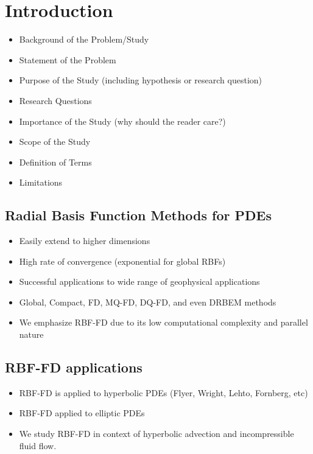 
\chapter{Introduction}

\begin{itemize} 
	\item Background of  the Problem/Study
	\item Statement of the Problem 
	\item Purpose of the Study (including hypothesis or research question)
	\item Research Questions
	\item Importance of the Study (why should the reader care?)
	\item Scope of the Study
	\item Definition of Terms
	\item Limitations
\end{itemize} 


\section{Radial Basis Function Methods for PDEs}

\begin{itemize}
\item Easily extend to higher dimensions
\item High rate of convergence (exponential for global RBFs)
\item Successful applications to wide range of geophysical applications
\item Global, Compact, FD, MQ-FD, DQ-FD, and even DRBEM methods
\item We emphasize RBF-FD due to its low computational complexity and parallel nature
\end{itemize} 

\section{RBF-FD applications} 
\begin{itemize} 
	\item RBF-FD is applied to hyperbolic PDEs (Flyer, Wright, Lehto, Fornberg, etc)
	\item RBF-FD applied to elliptic PDEs 
	\item We study RBF-FD in context of hyperbolic advection and incompressible fluid flow.
\end{itemize} 

